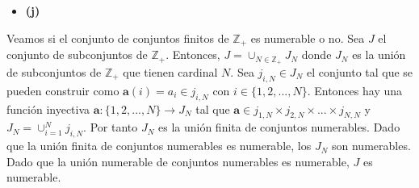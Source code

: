 \documentclass{article}
\newcommand{\vect}[1]{\boldsymbol{#1}}
\begin{document}
\begin{itemize}
\item \bf (j) \rm
\end{itemize}
Veamos si el conjunto de conjuntos finitos de $\mathbb{Z}_{+}$ es numerable o no. Sea $J$ el conjunto de subconjuntos de $\mathbb{Z}_{+}$. Entonces, $J=\cup_{N\in \mathbb{Z}_{+}}J_N$ donde $J_N$ es la unión de subconjuntos de $\mathbb{Z}_{+}$ que tienen cardinal $N$. Sea $j_{i,N}\in J_N$ el conjunto tal que se pueden construir como $\vect{a}(i)=a_i\in j_{i,N}$ con $i\in \{1,2,...,N\}$. Entonces hay una función inyectiva $\vect{a}:\{1,2,...,N\}\rightarrow J_N$ tal que $\vect{a}\in j_{1,N}\times j_{2,N}\times ... \times j_{N,N}$ y  $J_N=\cup^{N}_{i=1}j_{i,N}$. Por tanto $J_N$ es la unión finita de conjuntos numerables. Dado que la unión finita de conjuntos numerables es numerable, los $J_N$ son numerables. Dado que la unión numerable  de conjuntos numerables es numerable, $J$ es numerable.
\end{document}
